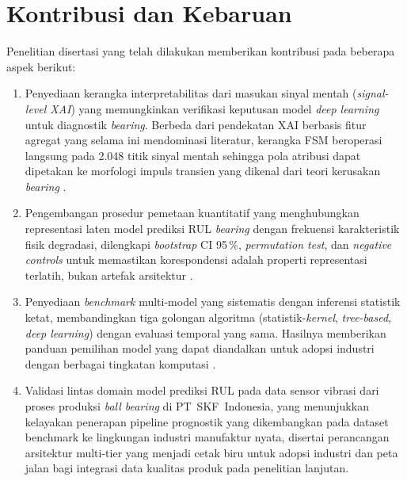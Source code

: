 \section{Kontribusi dan Kebaruan}
\label{sec:bab1_kontribusi}

Penelitian disertasi yang telah dilakukan memberikan kontribusi pada
beberapa aspek berikut:

\begin{enumerate}

  \item Penyediaan kerangka interpretabilitas dari masukan sinyal mentah (\emph{signal-level
        XAI}) yang memungkinkan verifikasi keputusan model
        \emph{deep learning} untuk diagnostik \emph{bearing}.
        Berbeda dari pendekatan XAI berbasis fitur agregat yang selama ini
        mendominasi literatur, kerangka FSM beroperasi langsung pada 2.048
        titik sinyal mentah sehingga pola atribusi dapat dipetakan ke
        morfologi impuls transien yang dikenal dari teori kerusakan
        \emph{bearing} .

  \item Pengembangan prosedur pemetaan kuantitatif yang menghubungkan
        representasi laten model prediksi RUL \emph{bearing} dengan
        frekuensi karakteristik fisik degradasi, dilengkapi
        \emph{bootstrap} CI 95\,\%, \emph{permutation test}, dan
        \emph{negative controls} untuk memastikan korespondensi adalah
        properti representasi terlatih, bukan artefak arsitektur
        .

  \item Penyediaan \emph{benchmark} multi-model yang sistematis dengan
        inferensi statistik ketat, membandingkan tiga {\color{blue}golongan} algoritma
        (statistik-\emph{kernel}, \emph{tree-based}, \emph{deep learning})
        dengan evaluasi temporal yang sama.
        Hasilnya memberikan panduan pemilihan model yang dapat diandalkan
        untuk adopsi industri dengan berbagai tingkatan komputasi
        .

  \item {\color{blue}Validasi lintas domain model prediksi RUL pada data
        sensor vibrasi dari proses produksi \emph{ball bearing} di
        PT~SKF~Indonesia, yang menunjukkan kelayakan penerapan pipeline
        prognostik yang dikembangkan pada dataset benchmark ke lingkungan
        industri manufaktur nyata, disertai perancangan arsitektur multi-tier
        yang menjadi cetak biru untuk adopsi industri dan peta jalan bagi
        integrasi data kualitas produk pada penelitian lanjutan.}


\end{enumerate}
